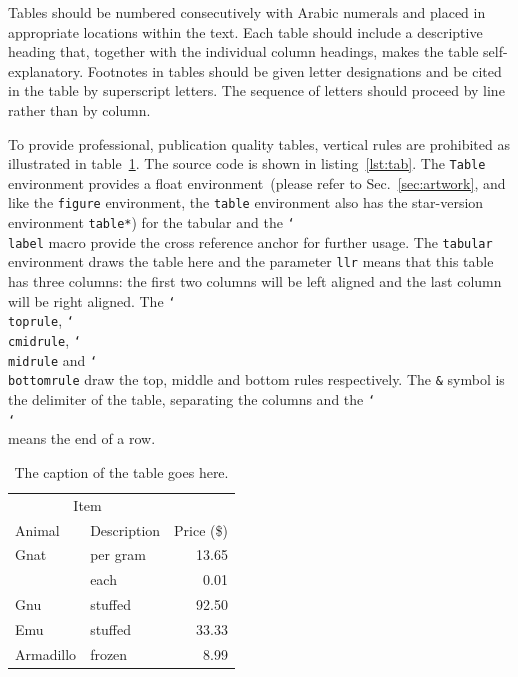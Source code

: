 \documentclass[submitting]{nst}
\begin{document}
Tables should be numbered consecutively with Arabic numerals and placed in appropriate locations within the text. Each table should include a descriptive heading that, together with the individual column headings, makes the table self-explanatory. Footnotes in tables should be given letter designations and be cited in the table by superscript letters. The sequence of letters should proceed by line rather than by column.

To provide professional, publication quality tables, vertical rules are prohibited as illustrated in table~\ref{tab:animal-price}. The source code is shown in listing~\ref{lst:tab}. The \texttt{Table} environment provides a float environment~(please refer to Sec.~\ref{sec:artwork}, and like the \verb|figure| environment, the \verb|table| environment also has the star-version environment \verb|table*|) for the tabular and the \texttt{\char`\\label} macro provide the cross reference anchor for further usage. The \texttt{tabular} environment draws the table here and the parameter \texttt{llr} means that this table has three columns: the first two columns will be left aligned and the last column will be right aligned. The \texttt{\char`\\toprule}, \texttt{\char`\\cmidrule}, \texttt{\char`\\midrule} and \texttt{\char`\\bottomrule} draw the top, middle and bottom rules respectively. The \texttt{\&} symbol is the delimiter of the table, separating the columns and the \texttt{\char`\\\char`\\} means the end of a row.

\begin{table}[!htb]
\caption{The caption of the table goes here.}
\label{tab:animal-price}
\begin{tabular*}{8cm} {@{\extracolsep{\fill} } llr}
\toprule
\multicolumn{2}{c}{Item} \\
\cmidrule(r){1-2}
Animal & Description & Price (\$) \\
\midrule
Gnat  & per gram & 13.65 \\
      & each     &  0.01 \\
Gnu   & stuffed  & 92.50 \\
Emu   & stuffed  & 33.33 \\
Armadillo & frozen & 8.99 \\
\bottomrule
\end{tabular*}
\end{table}
\end{document}
